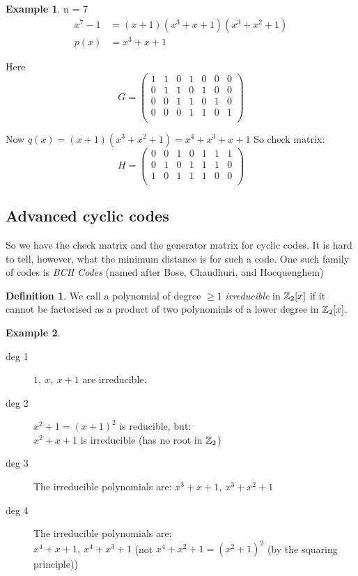 \documentclass[]{article}
\theoremstyle{definition}
\newtheorem*{defn}{Definition}
\newtheorem*{exmp}{Example}
\theoremstyle{remark}
\numberwithin{equation}{section}
\begin{document}
			\begin{exmp}
				n = 7
				\begin{align*}
					x^7-1 &= (x+1)(x^3+x+1)(x^3+x^2+1)\\
					p(x)  &= x^3+x+1
				\end{align*}

				Here
				\[
					G = \begin{pmatrix}
						1&1&0&1&0&0&0\\
						0&1&1&0&1&0&0\\
						0&0&1&1&0&1&0\\
						0&0&0&1&1&0&1\\
						\end{pmatrix}
				\]

				Now $q(x) = (x+1)(x^3+x^2+1) = x^4 + x^3 + x + 1$
				So check matrix:
				\[
					H = \begin{pmatrix}
						0 & 0 & 1 & 0 & 1  & 1 & 1\\
						0 & 1 & 0 & 1  & 1 & 1 & 0\\
						1 & 0 & 1  & 1 & 1 & 0 & 0\\
						\end{pmatrix}
				\]
			\end{exmp}
		\subsection{Advanced cyclic codes}
			\par So we have the check matrix and the generator matrix for cyclic codes. It is hard to tell, however, what the minimum distance is for such a code. One such family of codes is \emph{BCH Codes} (named after Bose, Chaudhuri, and Hocquenghem)\\

			\begin{defn}We call a polynomial of degree  $\geq 1$ \emph{irreducible} in $\mathbb{Z}_2[x]$ if it cannot be factorised as a product of two polynomials of a lower degree in $\mathbb{Z}_2[x]$.
			\end{defn}

			\begin{exmp}
				\begin{description}
					\item[deg 1]
						$1,\ x,\ x+1$ are irreducible.
					\item[deg 2]
						$x^2 +1 = (x+1)^2$ is reducible, but:\\
						$x^2+x+1$ is irreducible (has no root in $\mathbb{Z}_2$)
					\item[deg 3]
						The irreducible polynomials are: $x^3+x+1,\ x^3+x^2+1$
					\item[deg 4]
						The irreducible polynomials are:\\
						$x^4 + x + 1,\ x^4+x^3+1$ (not $x^4+x^2+1 = (x^2+1)^2$ (by the squaring principle))
				\end{description}
			\end{exmp}
\end{document}
